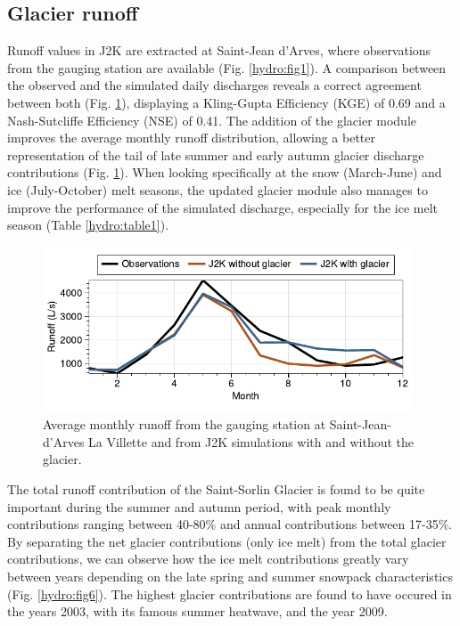 \subsection{Glacier runoff}

Runoff values in J2K are extracted at Saint-Jean d'Arves, where observations from the gauging station are available (Fig. \ref{hydro:fig1}). A comparison between the observed and the simulated daily discharges reveals a correct agreement between both (Fig. \ref{hydro:fig5}), displaying a Kling-Gupta Efficiency (KGE) of 0.69 and a Nash-Sutcliffe Efficiency (NSE) of 0.41. The addition of the glacier module improves the average monthly runoff distribution, allowing a better representation of the tail of late summer and early autumn glacier discharge contributions (Fig. \ref{hydro:fig5}). When looking specifically at the snow (March-June) and ice (July-October) melt seasons, the updated glacier module also manages to improve the performance of the simulated discharge, especially for the ice melt season (Table \ref{hydro:table1}). 

\begin{figure}[h]
\centering
\includegraphics[width=11cm]{Figures/hydro/Figure_5.pdf}
\caption{Average monthly runoff from the gauging station at Saint-Jean-d'Arves La Villette and from J2K simulations with and without the glacier.} 
\label{hydro:fig5}
\end{figure}

The total runoff contribution of the Saint-Sorlin Glacier is found to be quite important during the summer and autumn period, with peak monthly contributions ranging between 40-80\% and annual contributions between 17-35\%. By separating the net glacier contributions (only ice melt) from the total glacier contributions, we can observe how the ice melt contributions greatly vary between years depending on the late spring and summer snowpack characteristics (Fig. \ref{hydro:fig6}). The highest glacier contributions are found to have occured in the years 2003, with its famous summer heatwave, and the year 2009.

